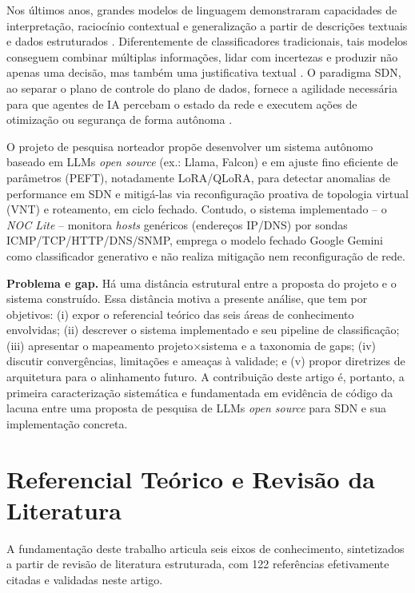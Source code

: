 \documentclass[12pt,a4paper]{article}
\begin{document}
Nos últimos anos, grandes modelos de linguagem demonstraram capacidades de
interpretação, raciocínio contextual e generalização a partir de descrições
textuais e dados estruturados \cite{rA31}. Diferentemente de classificadores
tradicionais, tais modelos conseguem combinar múltiplas informações, lidar com
incertezas e produzir não apenas uma decisão, mas também uma justificativa
textual \cite{rA321}. O paradigma SDN, ao separar o plano de controle do plano de
dados, fornece a agilidade necessária para que agentes de IA percebam o estado
da rede e executem ações de otimização ou segurança de forma autônoma \cite{rA19}.

O projeto de pesquisa norteador \cite{rRODRIGUES} propõe desenvolver um sistema
autônomo baseado em LLMs \textit{open source} (ex.: Llama, Falcon) e em
ajuste fino eficiente de parâmetros (PEFT), notadamente LoRA/QLoRA, para
detectar anomalias de performance em SDN e mitigá-las via reconfiguração
proativa de topologia virtual (VNT) e roteamento, em ciclo fechado. Contudo, o
sistema implementado -- o \textit{NOC Lite} -- monitora \textit{hosts}
genéricos (endereços IP/DNS) por sondas ICMP/TCP/HTTP/DNS/SNMP, emprega o
modelo fechado Google Gemini como classificador generativo e não realiza
mitigação nem reconfiguração de rede.

\textbf{Problema e gap.} Há uma distância estrutural entre a proposta do
projeto e o sistema construído. Essa distância motiva a presente análise, que
tem por objetivos: (i) expor o referencial teórico das seis áreas de
conhecimento envolvidas; (ii) descrever o sistema implementado e seu pipeline
de classificação; (iii) apresentar o mapeamento projeto$\times$sistema e a
taxonomia de gaps; (iv) discutir convergências, limitações e ameaças à
validade; e (v) propor diretrizes de arquitetura para o alinhamento futuro.
A contribuição deste artigo é, portanto, a primeira caracterização
sistemática e fundamentada em evidência de código da lacuna entre uma proposta
de pesquisa de LLMs \textit{open source} para SDN e sua implementação
concreta.

\section{Referencial Teórico e Revisão da Literatura}
\label{sec:referencial}

A fundamentação deste trabalho articula seis eixos de conhecimento, sintetizados
a partir de revisão de literatura estruturada, com 122 referências efetivamente
citadas e validadas neste artigo.
\end{document}

